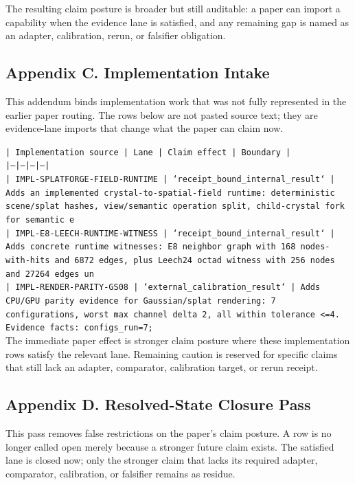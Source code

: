 \documentclass[11pt]{article}
\begin{document}
The resulting claim posture is broader but still auditable: a paper can import a capability when the evidence lane is satisfied, and any remaining gap is named as an adapter, calibration, rerun, or falsifier obligation.

\subsection*{Appendix C. Implementation Intake}

This addendum binds implementation work that was not fully represented in the earlier paper routing. The rows below are not pasted source text; they are evidence-lane imports that change what the paper can claim now.

\noindent\texttt{| Implementation source | Lane | Claim effect | Boundary |}\\
\noindent\texttt{|---|---|---|---|}\\
\noindent\texttt{| IMPL-SPLATFORGE-FIELD-RUNTIME | `receipt\_bound\_internal\_result` | Adds an implemented crystal-to-spatial-field runtime: deterministic scene/splat hashes, view/semantic operation split, child-crystal fork for semantic e}\\
\noindent\texttt{| IMPL-E8-LEECH-RUNTIME-WITNESS | `receipt\_bound\_internal\_result` | Adds concrete runtime witnesses: E8 neighbor graph with 168 nodes-with-hits and 6872 edges, plus Leech24 octad witness with 256 nodes and 27264 edges un}\\
\noindent\texttt{| IMPL-RENDER-PARITY-GS08 | `external\_calibration\_result` | Adds CPU/GPU parity evidence for Gaussian/splat rendering: 7 configurations, worst max channel delta 2, all within tolerance <=4. Evidence facts: configs\_run=7;}\\

The immediate paper effect is stronger claim posture where these implementation rows satisfy the relevant lane. Remaining caution is reserved for specific claims that still lack an adapter, comparator, calibration target, or rerun receipt.

\subsection*{Appendix D. Resolved-State Closure Pass}

This pass removes false restrictions on the paper's claim posture. A row is no longer called open merely because a stronger future claim exists. The satisfied lane is closed now; only the stronger claim that lacks its required adapter, comparator, calibration, or falsifier remains as residue.
\end{document}
